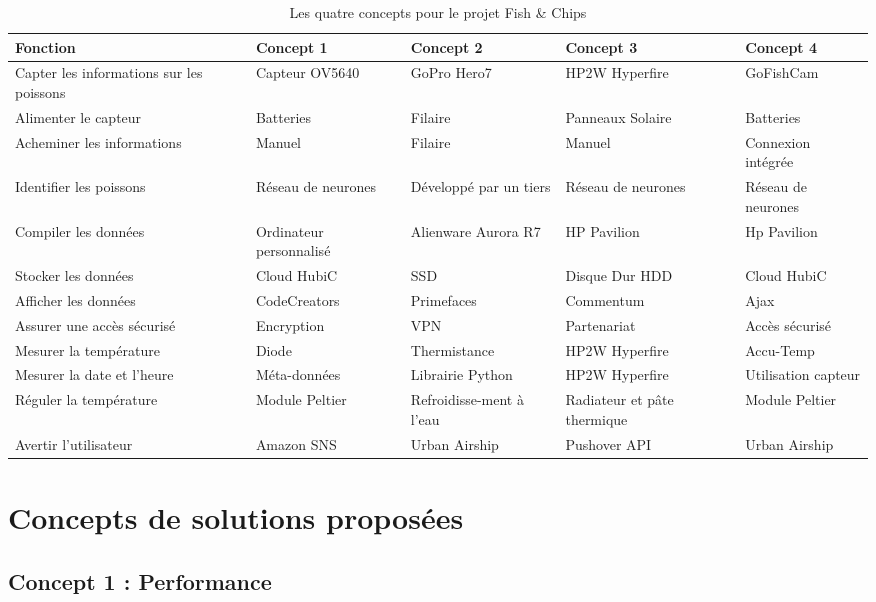 \begin{table}[h]
    \centering
    \begin{tabular}{|p{3cm}|p{3cm}|p{2.5cm}|p{2.5cm}|p{2.5cm}|}
    \hline
    \textbf{Fonction} & \textbf{Concept 1} & \textbf{Concept 2} & \textbf{Concept 3} & \textbf{Concept 4}\\ \hline
    Capter les informations sur les poissons & Capteur OV5640 & GoPro Hero7 & HP2W Hyperfire & GoFishCam \\ \hline
    Alimenter le capteur & Batteries & Filaire & Panneaux Solaire & Batteries \\ \hline
    Acheminer les informations & Manuel & Filaire & Manuel & Connexion intégrée \\ \hline
    Identifier les poissons & Réseau de neurones & Développé par un tiers & Réseau de neurones & Réseau de neurones \\ \hline
    Compiler les données & Ordinateur personnalisé & Alienware Aurora R7 & HP Pavilion & Hp Pavilion\\ \hline
    Stocker les données & Cloud HubiC & SSD & Disque Dur HDD & Cloud HubiC\\ \hline
    Afficher les données & CodeCreators & Primefaces & Commentum & Ajax\\ \hline
    Assurer une accès sécurisé & Encryption & VPN & Partenariat & Accès sécurisé\\ \hline
    Mesurer la température & Diode & Thermistance & HP2W Hyperfire & Accu-Temp\\ \hline
    Mesurer la date et l'heure & Méta-données & Librairie Python & HP2W Hyperfire & Utilisation capteur \\ \hline
    Réguler la température & Module Peltier & Refroidisse-ment à l'eau & Radiateur et pâte thermique & Module Peltier\\ \hline
    Avertir l'utilisateur & Amazon SNS & Urban Airship  & Pushover API & Urban Airship\\
    \hline
    \end{tabular}
    \caption{Les quatre concepts pour le projet Fish \& Chips}
    \label{tab:4_concepts}
\end{table}

\section{Concepts de solutions proposées}

\subsection{Concept 1 : Performance}


